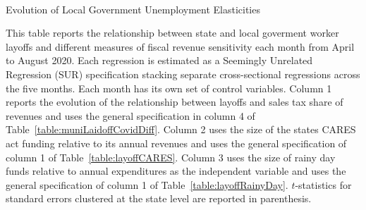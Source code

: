 \begin{table}[!ht]
\begin{center}
\begin{threeparttable}

\caption{\\ Evolution of Local Government Unemployment Elasticities}
\label{table:mediumrun}

\centering 

\begin{small}

	

\end{small}

\begin{footnotesize}
\begin{tablenotes}
\item This table reports the relationship between state and local goverment worker layoffs and different measures of fiscal revenue sensitivity each month from April to August 2020. Each regression is estimated as a Seemingly Unrelated Regression (SUR) specification stacking separate cross-sectional regressions across the five months. Each month has its own set of control variables. Column 1 reports the evolution of the relationship between layoffs and sales tax share of revenues and uses the general specification in column 4 of Table~\ref{table:muniLaidoffCovidDiff}. Column 2 uses the size of the states CARES act funding relative to its annual revenues and uses the general specification of column 1 of Table~\ref{table:layoffCARES}. Column 3 uses the size of rainy day funds relative to annual expenditures as the independent variable and uses the general specification of column 1 of Table~\ref{table:layoffRainyDay}. $t$-statistics for standard errors clustered at the state level are reported in parenthesis. 

\end{tablenotes}
\end{footnotesize}
\end{threeparttable}
\end{center}
\end{table}
\thispagestyle{empty}



